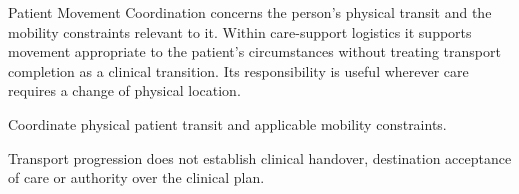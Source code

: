 Patient Movement Coordination concerns the person's physical transit and the mobility constraints relevant to it. Within care-support logistics it supports movement appropriate to the patient's circumstances without treating transport completion as a clinical transition. Its responsibility is useful wherever care requires a change of physical location.



Coordinate physical patient transit and applicable mobility constraints.



Transport progression does not establish clinical handover, destination acceptance of care or authority over the clinical plan.


